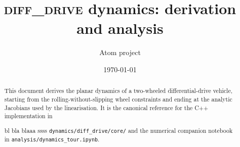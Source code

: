 \documentclass[11pt]{article}
\title{\textsc{diff\_drive} dynamics: derivation and analysis}
\author{Atom project}
\date{\today}
\begin{document}
\maketitle

\begin{abstract}
This document derives the planar dynamics of a two-wheeled differential-drive
vehicle, starting from the rolling-without-slipping wheel constraints and
ending at the analytic Jacobians used by the linearisation. It is the
canonical reference for the C++ implementation in

bl bla blaaa  ssss
\texttt{dynamics/diff\_drive/core/} and the numerical companion notebook in
\texttt{analysis/dynamics\_tour.ipynb}.
\end{abstract}

\tableofcontents
\bigskip




\end{document}
